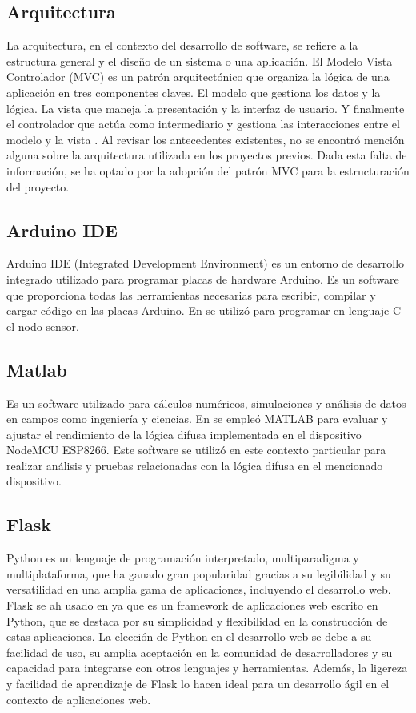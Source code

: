 \subsection{Arquitectura}
La arquitectura, en el contexto del desarrollo de software, se refiere a la estructura general y el diseño de un sistema o una aplicación. El Modelo Vista Controlador (MVC) es un patrón arquitectónico que organiza la lógica de una aplicación en tres componentes claves. El modelo que gestiona los datos y la lógica. La vista que maneja la presentación y la interfaz de usuario. Y finalmente el controlador que actúa como intermediario y gestiona las interacciones entre el modelo y la vista \cite{bascon_pantoja_patron_2004}. Al revisar los antecedentes existentes, no se encontró mención alguna sobre la arquitectura utilizada en los proyectos previos. Dada esta falta de información, se ha optado por la adopción del patrón MVC para la estructuración del proyecto.


\subsection{Arduino IDE}
Arduino IDE (Integrated Development Environment) es un entorno de desarrollo integrado utilizado para programar placas de hardware Arduino. Es un software que proporciona todas las herramientas necesarias para escribir, compilar y cargar código en las placas Arduino. En \cite{widyawati_fuzzy_2022} se utilizó para programar en lenguaje C el nodo sensor.


\subsection{Matlab}
Es un software utilizado para cálculos numéricos, simulaciones y análisis de datos en campos como ingeniería y ciencias. En \cite{widyawati_fuzzy_2022} se empleó MATLAB para evaluar y ajustar el rendimiento de la lógica difusa implementada en el dispositivo NodeMCU ESP8266. Este software se utilizó en este contexto particular para realizar análisis y pruebas relacionadas con la lógica difusa en el mencionado dispositivo.


\subsection{Flask}
Python es un lenguaje de programación interpretado, multiparadigma y multiplataforma, que ha ganado gran popularidad gracias a su legibilidad y su versatilidad en una amplia gama de aplicaciones, incluyendo el desarrollo web. Flask se ah usado en \cite{noauthor_fuzzy_2023} ya que es un framework de aplicaciones web escrito en Python, que se destaca por su simplicidad y flexibilidad en la construcción de estas aplicaciones. La elección de Python en el desarrollo web se debe a su facilidad de uso, su amplia aceptación en la comunidad de desarrolladores y su capacidad para integrarse con otros lenguajes y herramientas. Además, la ligereza y facilidad de aprendizaje de Flask lo hacen ideal para un desarrollo ágil en el contexto de aplicaciones web.


